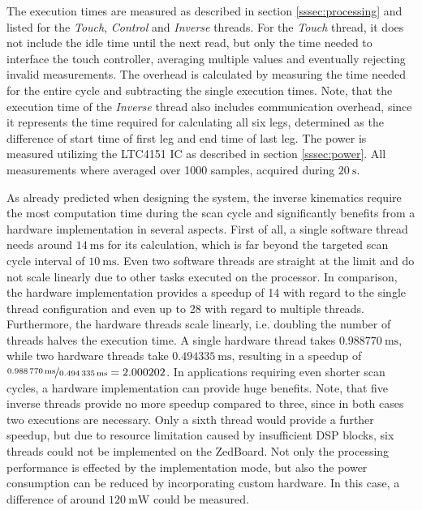 The execution times are measured as described in section
\ref{sssec:processing} and listed for the \emph{Touch}, \emph{Control} and
\emph{Inverse} threads. For the \emph{Touch} thread, it does not include the
idle time until the next read, but only the time needed to interface the touch
controller, averaging multiple values and eventually rejecting invalid
measurements. The overhead is calculated by measuring the time needed for the
entire cycle and subtracting the single execution times. Note, that the
execution time of the \emph{Inverse} thread also includes communication
overhead, since it represents the time required for calculating all six legs,
determined as the difference of start time of first leg and end time of last
leg. The power is measured utilizing the LTC4151 \ac{IC} as described in
section \ref{sssec:power}. All measurements where averaged over 1000 samples,
acquired during $\SI{20}{\second}$.

As already predicted when designing the system, the inverse kinematics require
the most computation time during the scan cycle and significantly benefits
from a hardware implementation in several aspects. First of all, a single
software thread needs around $\SI{14}{\milli\second}$ for its calculation,
which is far beyond the targeted scan cycle interval of
$\SI{10}{\milli\second}$. Even two software threads are straight at the limit
and do not scale linearly due to other tasks executed on the processor. In
comparison, the hardware implementation provides a speedup of 14 with regard
to the single thread configuration and even up to 28 with regard to multiple
threads. Furthermore, the hardware threads scale linearly, i.e. doubling the
number of threads halves the execution time. A single hardware thread takes
$\SI{0.988770}{\milli\second}$, while two hardware threads take
$\SI{0.494335}{\milli\second}$, resulting in a speedup of $\nicefrac{\SI{0.988
770}{\milli\second}}{\SI{0.494335}{\milli\second}}=2.000202$. In applications
requiring even shorter scan cycles, a hardware implementation can provide huge
benefits. Note, that five inverse threads provide no more speedup compared to
three, since in both cases two executions are necessary. Only a sixth thread
would provide a further speedup, but due to resource limitation caused by
insufficient \ac{DSP} blocks, six threads could not be implemented on the
ZedBoard. Not only the processing performance is effected by the
implementation mode, but also the power consumption can be reduced by
incorporating custom hardware. In this case, a difference of around
$\SI{120}{\milli\watt}$ could be measured.

